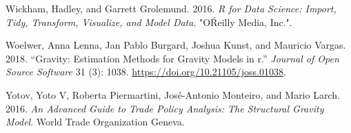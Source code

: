 \documentclass[12pt,reqno,oneside,pdftex]{formato-puc/puctesis} %
\newenvironment{CSLReferences}
  {}
  {\par}
\begin{document}
\begin{CSLReferences}{1}{0}
\leavevmode\hypertarget{ref-wickham2016r}{}%
Wickham, Hadley, and Garrett Grolemund. 2016. \emph{R for Data Science:
Import, Tidy, Transform, Visualize, and Model Data}. "OŔeilly Media,
Inc.".

\leavevmode\hypertarget{ref-Woelver2018}{}%
Woelwer, Anna Lenna, Jan Pablo Burgard, Joshua Kunst, and Mauricio
Vargas. 2018. {``Gravity: Estimation Methods for Gravity Models in r.''}
\emph{Journal of Open Source Software} 31 (3): 1038.
\url{https://doi.org/10.21105/joss.01038}.

\leavevmode\hypertarget{ref-yotov2016advanced}{}%
Yotov, Yoto V, Roberta Piermartini, José-Antonio Monteiro, and Mario
Larch. 2016. \emph{An Advanced Guide to Trade Policy Analysis: The
Structural Gravity Model}. World Trade Organization Geneva.

\end{CSLReferences}
\end{document}
